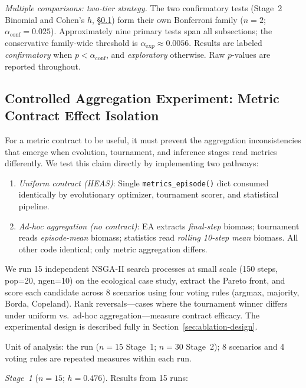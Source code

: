 \documentclass{wscpaperproc}
\begin{document}
\emph{Multiple comparisons: two-tier strategy.} The two
confirmatory tests (Stage~2 Binomial and Cohen's $h$, \S\ref{sec:controlled-agg})
form their own Bonferroni family ($n\!=\!2$;
$\alpha_{\text{conf}}\!=\!0.025$). Approximately nine primary tests span all
subsections; the conservative family-wide threshold is
$\alpha_{\text{exp}}\!\approx\!0.0056$. Results are labeled
\emph{confirmatory} when $p\!<\!\alpha_{\text{conf}}$, and \emph{exploratory}
otherwise. Raw $p$-values are reported throughout.

\subsection{Controlled Aggregation Experiment: Metric Contract Effect Isolation}
\label{sec:controlled-agg}

For a metric contract to be useful, it must prevent the aggregation inconsistencies
that emerge when evolution, tournament, and inference stages read metrics differently.
We test this claim directly by implementing two pathways:

\begin{enumerate}
\item \emph{Uniform contract (HEAS)}: Single \texttt{metrics\_episode()} dict consumed
identically by evolutionary optimizer, tournament scorer, and statistical pipeline.
\item \emph{Ad-hoc aggregation (no contract)}: EA extracts \emph{final-step} biomass;
tournament reads \emph{episode-mean} biomass; statistics read \emph{rolling 10-step mean}
biomass. All other code identical; only metric aggregation differs.
\end{enumerate}

We run 15 independent NSGA-II search processes at small scale (150 steps, pop=20,
ngen=10) on the ecological case study, extract the Pareto front, and score each
candidate across 8 scenarios using four voting rules (argmax, majority, Borda,
Copeland). Rank reversals---cases where the tournament winner differs under uniform
vs.\ ad-hoc aggregation---measure contract efficacy. The experimental design is
described fully in Section~\ref{sec:ablation-design}.

Unit of analysis: the run ($n\!=\!15$ Stage~1; $n\!=\!30$ Stage~2); 8 scenarios and 4 voting rules are repeated measures within each run.

\emph{Stage~1} ($n\!=\!15$; $h\!=\!0.476$). Results from 15 runs:
\end{document}
